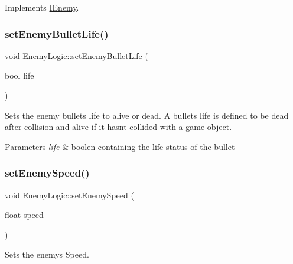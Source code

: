 Implements \hyperlink{class_i_enemy_acbc451cafee99cb405d9d9248820b6ea}{I\+Enemy}.

\mbox{\label{class_enemy_logic_a88584f95e49bfd6b174b9b1d9a274cc5}} 
\subsubsection{\texorpdfstring{set\+Enemy\+Bullet\+Life()}{setEnemyBulletLife()}}
{\footnotesize\ttfamily void Enemy\+Logic\+::set\+Enemy\+Bullet\+Life (\begin{DoxyParamCaption}\item[{bool}]{life }\end{DoxyParamCaption})}



Sets the enemy bullets life to alive or dead. A bullets life is defined to be dead after collision and alive if it hasnt collided with a game object. 


\begin{DoxyParams}{Parameters}
{\em life} & boolen containing the life status of the bullet \\
\hline
\end{DoxyParams}
\mbox{\label{class_enemy_logic_aae66ecc1d28feaef7c814a0dff7eed95}} 
\subsubsection{\texorpdfstring{set\+Enemy\+Speed()}{setEnemySpeed()}}
{\footnotesize\ttfamily void Enemy\+Logic\+::set\+Enemy\+Speed (\begin{DoxyParamCaption}\item[{float}]{speed }\end{DoxyParamCaption})}



Sets the enemy\textquotesingle{}s Speed. 

